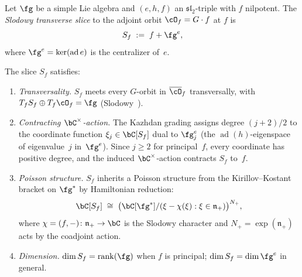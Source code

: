 \begin{definition}\label{def:slodowy-slice}
Let $\fg$ be a simple Lie algebra and $(e, h, f)$ an
$\mathfrak{sl}_2$-triple with $f$ nilpotent.  The \emph{Slodowy
transverse slice} to the adjoint orbit $\cO_f = G \cdot f$ at $f$ is
\begin{equation}\label{eq:slodowy-slice}
S_f \;:=\; f + \fg^e,
\end{equation}
where $\fg^e = \ker(\operatorname{ad} e)$ is the centralizer of~$e$.
\end{definition}

\begin{proposition}
\label{prop:slodowy-properties}
The slice $S_f$ satisfies:
\begin{enumerate}[label=\textup{(\roman*)}]
\item \emph{Transversality.} $S_f$ meets every $G$-orbit in
  $\overline{\cO}_f$ transversally, with
  $T_f S_f \oplus T_f \cO_f = \fg$
  \textup{(}Slodowy~\textup{\cite{Slodowy80}}\textup{)}.
\item \emph{Contracting $\bC^\times$-action.}  The Kazhdan grading
  assigns degree $(j+2)/2$ to the coordinate function
  $\xi_j \in \bC[S_f]$ dual to $\fg^e_j$
  (the $\operatorname{ad}(h)$-eigenspace of eigenvalue~$j$
  in~$\fg^e$).  Since $j \geq 2$ for principal~$f$,
  every coordinate has positive degree, and the induced
  $\bC^\times$-action contracts $S_f$ to~$f$.
\item \emph{Poisson structure.}  $S_f$ inherits a Poisson structure
  from the Kirillov--Kostant bracket on $\fg^*$ by
  Hamiltonian reduction:
  \begin{equation}\label{eq:slodowy-poisson}
  \bC[S_f] \;\cong\; \bigl(\bC[\fg^*] / (\xi - \chi(\xi)
  : \xi \in \mathfrak{n}_+)\bigr)^{N_+},
  \end{equation}
  where $\chi = (f, -) \colon \mathfrak{n}_+ \to \bC$ is the
  Slodowy character and $N_+ = \exp(\mathfrak{n}_+)$
  acts by the coadjoint action.
\item \emph{Dimension.}  $\dim S_f = \operatorname{rank}(\fg)$
  when $f$ is principal\textup{;}
  $\dim S_f = \dim \fg^e$ in general.
\end{enumerate}
\end{proposition}

